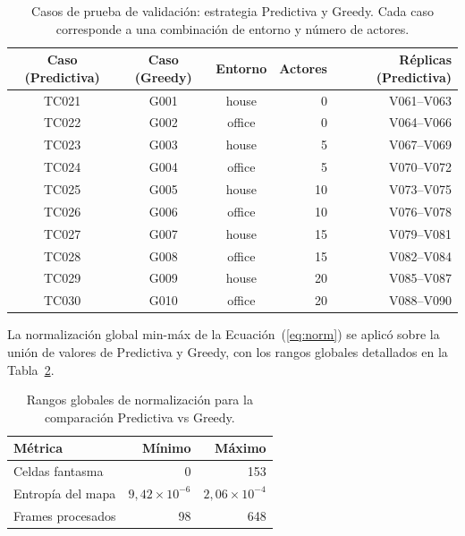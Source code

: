 \begin{table}[htbp]
    \centering
    \caption{Casos de prueba de validación: estrategia Predictiva y Greedy. Cada caso corresponde a una combinación de entorno y número de actores.}%
    \label{tab:casos_predictiva}
    \begin{tabular}{cccrr}
        \toprule
        \textbf{Caso (Predictiva)} & \textbf{Caso (Greedy)} & \textbf{Entorno} & \textbf{Actores} & \textbf{Réplicas (Predictiva)} \\
        \midrule
        TC021 & G001 & house  &  0 & V061–V063 \\
        TC022 & G002 & office &  0 & V064–V066 \\
        TC023 & G003 & house  &  5 & V067–V069 \\
        TC024 & G004 & office &  5 & V070–V072 \\
        TC025 & G005 & house  & 10 & V073–V075 \\
        TC026 & G006 & office & 10 & V076–V078 \\
        TC027 & G007 & house  & 15 & V079–V081 \\
        TC028 & G008 & office & 15 & V082–V084 \\
        TC029 & G009 & house  & 20 & V085–V087 \\
        TC030 & G010 & office & 20 & V088–V090 \\
        \bottomrule
    \end{tabular}
\end{table}

La normalización global min-máx de la Ecuación~(\ref{eq:norm}) se aplicó sobre la unión de valores de Predictiva y Greedy, con los rangos globales detallados en la Tabla~\ref{tab:rangos_globales_e3}.

\begin{table}[htbp]
    \centering
    \caption{Rangos globales de normalización para la comparación Predictiva vs Greedy.}%
    \label{tab:rangos_globales_e3}
    \begin{tabular}{lrr}
        \toprule
        \textbf{Métrica} & \textbf{Mínimo} & \textbf{Máximo} \\
        \midrule
        Celdas fantasma & 0 & 153 \\
        Entropía del mapa & $9{,}42 \times 10^{-6}$ & $2{,}06 \times 10^{-4}$ \\
        Frames procesados & 98 & 648 \\
        \bottomrule
    \end{tabular}
\end{table}

